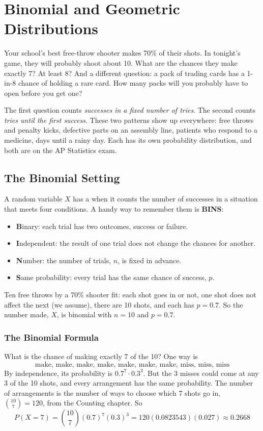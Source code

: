 \chapter{Binomial and Geometric Distributions}

Your school's best free-throw shooter makes 70\% of their shots. In tonight's game,
they will probably shoot about 10. What are the chances they make exactly 7? At
least 8? And a different question: a pack of trading cards has a 1-in-8 chance of
holding a rare card. How many packs will you probably have to open before you get
one?

The first question counts \emph{successes in a fixed number of tries}. The second
counts \emph{tries until the first success}. These two patterns show up everywhere:
free throws and penalty kicks, defective parts on an assembly line, patients who
respond to a medicine, days until a rainy day. Each has its own probability
distribution, and both are on the AP Statistics exam.

\section{The Binomial Setting}
A random variable $X$ has a  when it counts the
number of successes in a situation that meets four conditions. A handy way to
remember them is \textbf{BINS}:
\begin{itemize}
\item \textbf{B}inary: each trial has two outcomes, success or failure.
\item \textbf{I}ndependent: the result of one trial does not change the chances for another.
\item \textbf{N}umber: the number of trials, $n$, is fixed in advance.
\item \textbf{S}ame probability: every trial has the same chance of success, $p$.
\end{itemize}
Ten free throws by a 70\% shooter fit: each shot goes in or not, one shot does not
affect the next (we assume), there are 10 shots, and each has $p = 0.7$. So the
number made, $X$, is binomial with $n = 10$ and $p = 0.7$.

\subsection{The Binomial Formula}
What is the chance of making exactly 7 of the 10? One way is
$$\text{make, make, make, make, make, make, make, miss, miss, miss}$$
By independence, its probability is $0.7^7 \cdot 0.3^3$. But the 3 misses could
come at any 3 of the 10 shots, and every arrangement has the same probability.
The number of arrangements is the number of ways to choose which 7 shots go in,
$\binom{10}{7} = 120$, from the Counting chapter. So
$$P(X = 7) = \binom{10}{7}(0.7)^7(0.3)^3 = 120(0.0823543)(0.027) \approx 0.2668$$

